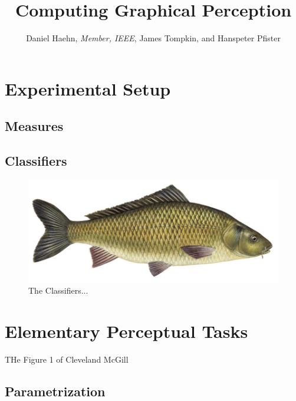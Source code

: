 \documentclass[journal]{vgtc}                %
\title{Computing Graphical Perception}
\author{Daniel Haehn, \textit{Member, IEEE}, James Tompkin, and Hanspeter Pfister}
\begin{document}






\section{Experimental Setup}

\subsection{Measures}

\subsection{Classifiers}

\begin{figure}[t]
	  \includegraphics[width=\linewidth]{fish.jpg}
  \caption{The Classifiers...}
	\label{fig:classifiers}
\end{figure}

\section{Elementary Perceptual Tasks}

THe Figure 1 of Cleveland McGill

\subsection{Parametrization}
\end{document}
